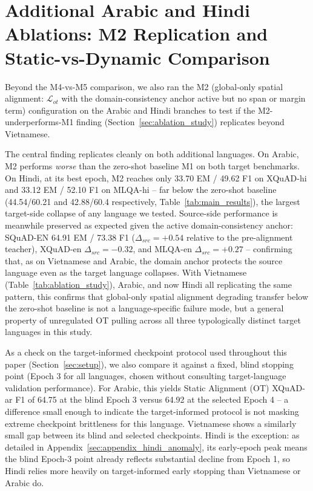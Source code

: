 \documentclass[11pt]{article}
\begin{document}
\section{Additional Arabic and Hindi Ablations: M2 Replication and Static-vs-Dynamic Comparison}
\label{sec:appendix_arabic_hindi_margin}
Beyond the M4-vs-M5 comparison, we also ran the M2 (global-only spatial alignment: $\mathcal{L}_{ot}$ with the domain-consistency anchor active but no span or margin term) configuration on the Arabic and Hindi branches to test if the M2-underperforms-M1 finding (Section~\ref{sec:ablation_study}) replicates beyond Vietnamese.

The central finding replicates cleanly on both additional languages. On Arabic, M2 performs \emph{worse} than the zero-shot baseline M1 on both target benchmarks. On Hindi, at its best epoch, M2 reaches only 33.70 EM / 49.62 F1 on XQuAD-hi and 33.12 EM / 52.10 F1 on MLQA-hi -- far below the zero-shot baseline (44.54/60.21 and 42.88/60.4 respectively, Table~\ref{tab:main_results}), the largest target-side collapse of any language we tested. Source-side performance is meanwhile preserved as expected given the active domain-consistency anchor: SQuAD-EN 64.91 EM / 73.38 F1 ($\Delta_{src}=+0.54$ relative to the pre-alignment teacher), XQuAD-en $\Delta_{src}=-0.32$, and MLQA-en $\Delta_{src}=+0.27$ -- confirming that, as on Vietnamese and Arabic, the domain anchor protects the source language even as the target language collapses. With Vietnamese (Table~\ref{tab:ablation_study}), Arabic, and now Hindi all replicating the same pattern, this confirms that global-only spatial alignment degrading transfer below the zero-shot baseline is not a language-specific failure mode, but a general property of unregulated OT pulling across all three typologically distinct target languages in this study.

As a check on the target-informed checkpoint protocol used throughout this paper (Section~\ref{sec:setup}), we also compare it against a fixed, blind stopping point (Epoch 3 for all languages, chosen without consulting target-language validation performance). For Arabic, this yields Static Alignment (OT) XQuAD-ar F1 of 64.75 at the blind Epoch 3 versus 64.92 at the selected Epoch 4 -- a difference small enough to indicate the target-informed protocol is not masking extreme checkpoint brittleness for this language. Vietnamese shows a similarly small gap between its blind and selected checkpoints. Hindi is the exception: as detailed in Appendix~\ref{sec:appendix_hindi_anomaly}, its early-epoch peak means the blind Epoch-3 point already reflects substantial decline from Epoch 1, so Hindi relies more heavily on target-informed early stopping than Vietnamese or Arabic do.
\end{document}
